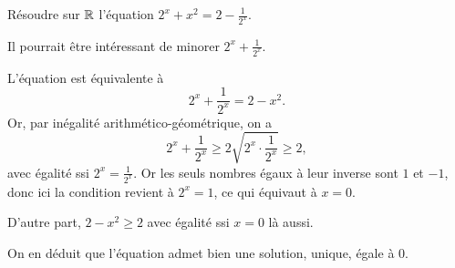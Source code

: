 \begin{exo}
 Résoudre sur $\mathbb R$ l'équation $2^x + x^2 = 2-\frac{1}{2^x}$.
 
\begin{hint}
Il pourrait être intéressant de minorer $2^x+\frac{1}{2^x}$.
\end{hint}

\begin{sol} 
L'équation est équivalente à 
\[ 2^x +\frac{1}{2^x} = 2-x^2.\]
Or, par inégalité arithmético-géométrique, on a 
\[ 2^x +\frac{1}{2^x} \geq 2\sqrt{2^x\cdot \frac{1}{2^x}} \geq 2,\]
avec égalité ssi $2^x = \frac{1}{2^x}$. Or les seuls nombres égaux à leur inverse sont $1$ et $-1$, donc ici la condition revient à $2^x=1$, ce qui équivaut à $x=0$.

D'autre part, $2-x^2\geq 2$ avec égalité ssi $x=0$ là aussi.

On en déduit que l'équation admet bien une solution, unique, égale à $0$.
\end{sol}  
\end{exo}

